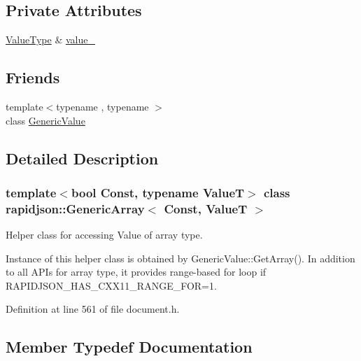 \subsection*{Private Attributes}
\begin{DoxyCompactItemize}
\item 
\mbox{\hyperlink{classrapidjson_1_1_generic_array_aebd828a2f020262b41af908fbb28a571}{Value\+Type}} \& \mbox{\hyperlink{classrapidjson_1_1_generic_array_aa07e77345654d3046ed522d533d23f00}{value\+\_\+}}
\end{DoxyCompactItemize}
\subsection*{Friends}
\begin{DoxyCompactItemize}
\item 
{\footnotesize template$<$typename , typename $>$ }\\class \mbox{\hyperlink{classrapidjson_1_1_generic_array_a899449e1a645b5e377af059fb61113d8}{Generic\+Value}}
\end{DoxyCompactItemize}


\subsection{Detailed Description}
\subsubsection*{template$<$bool Const, typename ValueT$>$\newline
class rapidjson\+::\+Generic\+Array$<$ Const, Value\+T $>$}

Helper class for accessing Value of array type. 

Instance of this helper class is obtained by {\ttfamily Generic\+Value\+::\+Get\+Array()}. In addition to all A\+P\+Is for array type, it provides range-\/based for loop if {\ttfamily R\+A\+P\+I\+D\+J\+S\+O\+N\+\_\+\+H\+A\+S\+\_\+\+C\+X\+X11\+\_\+\+R\+A\+N\+G\+E\+\_\+\+F\+OR=1}. 

Definition at line 561 of file document.\+h.



\subsection{Member Typedef Documentation}
\mbox{\label{classrapidjson_1_1_generic_array_a82298d507b2b15c9d909c25a32f5afeb}} 
